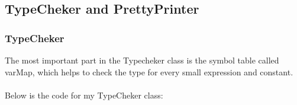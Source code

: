 \documentclass[a4paper,12pt,titlepage]{article}
\begin{document}
\subsection{TypeCheker and PrettyPrinter}

\subsubsection{TypeCheker}
The most important part in the Typecheker class is the symbol table called  {\footnotesize\ttfamily varMap}, which helps to check the type for every small expression and constant.
\\
\\
Below is the code for my  {\footnotesize\ttfamily TypeCheker} class:
\end{document}
